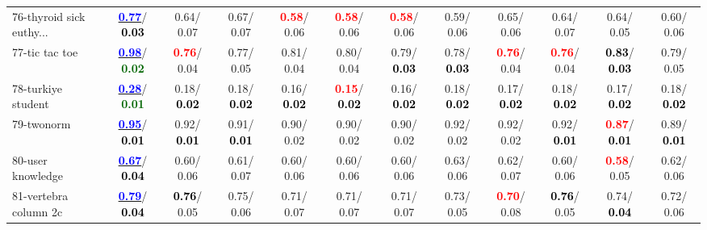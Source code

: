 \begin{table}[h]
\begin{center}
{\begin{tabular}{lc|c|c|c|c|c|c|c|c|c|c}
76-thyroid sick euthy... & \underline{\textcolor{blue}{\textbf{  0.77}}}/\textcolor{black}{\textbf{  0.03}} &   0.64/  0.07 &   0.67/  0.07 & \textcolor{red}{\textbf{  0.58}}/  0.06 & \textcolor{red}{\textbf{  0.58}}/  0.06 & \textcolor{red}{\textbf{  0.58}}/  0.06 &   0.59/  0.06 &   0.65/  0.06 &   0.64/  0.07 &   0.64/  0.05 &   0.60/  0.06 \\
77-tic tac toe & \underline{\textcolor{blue}{\textbf{  0.98}}}/\textcolor{darkgreen}{\textbf{  0.02}} & \textcolor{red}{\textbf{  0.76}}/  0.04 &   0.77/  0.05 &   0.81/  0.04 &   0.80/  0.04 &   0.79/\textcolor{black}{\textbf{  0.03}} &   0.78/\textcolor{black}{\textbf{  0.03}} & \textcolor{red}{\textbf{  0.76}}/  0.04 & \textcolor{red}{\textbf{  0.76}}/  0.04 & \textcolor{black}{\textbf{  0.83}}/\textcolor{black}{\textbf{  0.03}} &   0.79/  0.05 \\
78-turkiye student & \underline{\textcolor{blue}{\textbf{  0.28}}}/\textcolor{darkgreen}{\textbf{  0.01}} &   0.18/\textcolor{black}{\textbf{  0.02}} &   0.18/\textcolor{black}{\textbf{  0.02}} &   0.16/\textcolor{black}{\textbf{  0.02}} & \textcolor{red}{\textbf{  0.15}}/\textcolor{black}{\textbf{  0.02}} &   0.16/\textcolor{black}{\textbf{  0.02}} &   0.18/\textcolor{black}{\textbf{  0.02}} &   0.17/\textcolor{black}{\textbf{  0.02}} &   0.18/\textcolor{black}{\textbf{  0.02}} &   0.17/\textcolor{black}{\textbf{  0.02}} &   0.18/\textcolor{black}{\textbf{  0.02}} \\ \hline
79-twonorm & \underline{\textcolor{blue}{\textbf{  0.95}}}/\textcolor{black}{\textbf{  0.01}} &   0.92/\textcolor{black}{\textbf{  0.01}} &   0.91/\textcolor{black}{\textbf{  0.01}} &   0.90/  0.02 &   0.90/  0.02 &   0.90/  0.02 &   0.92/  0.02 &   0.92/  0.02 &   0.92/\textcolor{black}{\textbf{  0.01}} & \textcolor{red}{\textbf{  0.87}}/\textcolor{black}{\textbf{  0.01}} &   0.89/\textcolor{black}{\textbf{  0.01}} \\
80-user knowledge & \underline{\textcolor{blue}{\textbf{  0.67}}}/\textcolor{black}{\textbf{  0.04}} &   0.60/  0.06 &   0.61/  0.07 &   0.60/  0.06 &   0.60/  0.06 &   0.60/  0.06 &   0.63/  0.06 &   0.62/  0.07 &   0.60/  0.06 & \textcolor{red}{\textbf{  0.58}}/  0.05 &   0.62/  0.06 \\
81-vertebra column 2c & \underline{\textcolor{blue}{\textbf{  0.79}}}/\textcolor{black}{\textbf{  0.04}} & \textcolor{black}{\textbf{  0.76}}/  0.05 &   0.75/  0.06 &   0.71/  0.07 &   0.71/  0.07 &   0.71/  0.07 &   0.73/  0.05 & \textcolor{red}{\textbf{  0.70}}/  0.08 & \textcolor{black}{\textbf{  0.76}}/  0.05 &   0.74/\textcolor{black}{\textbf{  0.04}} &   0.72/  0.06 \\

\end{tabular}}
\end{center}
\end{table}
